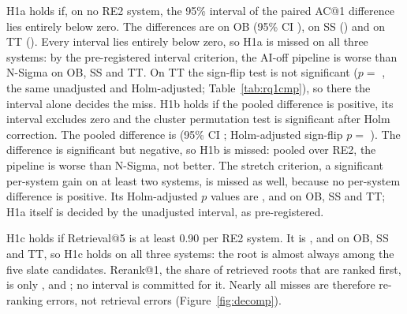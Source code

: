H1a holds if, on no RE2 system, the 95\% interval of the paired AC@1 difference lies entirely below zero.
The differences are  on OB (95\% CI ),  on SS () and  on TT ().
Every interval lies entirely below zero, so H1a is missed on all three systems: by the pre-registered interval criterion, the AI-off pipeline is worse than N-Sigma on OB, SS and TT.
On TT the sign-flip test is not significant ($p = $ , the same unadjusted and Holm-adjusted; Table~\ref{tab:rq1cmp}), so there the interval alone decides the miss.
H1b holds if the pooled difference is positive, its interval excludes zero and the cluster permutation test is significant after Holm correction.
The pooled difference is  (95\% CI ; Holm-adjusted sign-flip $p = $ ).
The difference is significant but negative, so H1b is missed: pooled over RE2, the pipeline is worse than N-Sigma, not better.
The stretch criterion, a significant per-system gain on at least two systems, is missed as well, because no per-system difference is positive.
Its Holm-adjusted $p$ values are ,  and  on OB, SS and TT; H1a itself is decided by the unadjusted interval, as pre-registered.

H1c holds if Retrieval@5 is at least 0.90 per RE2 system.
It is ,  and  on OB, SS and TT, so H1c holds on all three systems: the root is almost always among the five slate candidates.
Rerank@1, the share of retrieved roots that are ranked first, is only ,  and ; no interval is committed for it.
Nearly all misses are therefore re-ranking errors, not retrieval errors (Figure~\ref{fig:decomp}).

